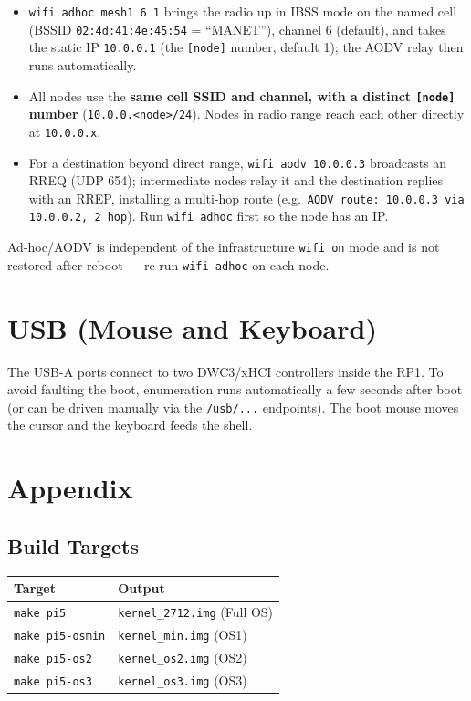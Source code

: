 \documentclass[a4paper,11pt]{article}
\newcommand{\cmd}[1]{\texttt{#1}}
\begin{document}
\begin{itemize}[noitemsep]
  \item \cmd{wifi adhoc mesh1 6 1} brings the radio up in IBSS mode on the named
        cell (BSSID \texttt{02:4d:41:4e:45:54} = ``MANET''), channel 6 (default),
        and takes the static IP \texttt{10.0.0.1} (the \texttt{[node]} number,
        default 1); the AODV relay then runs automatically.
  \item All nodes use the \textbf{same cell SSID and channel, with a distinct
        \texttt{[node]} number} (\texttt{10.0.0.<node>/24}). Nodes in radio range
        reach each other directly at \texttt{10.0.0.x}.
  \item For a destination beyond direct range, \cmd{wifi aodv 10.0.0.3}
        broadcasts an RREQ (UDP 654); intermediate nodes relay it and the
        destination replies with an RREP, installing a multi-hop route
        (e.g.\ \texttt{AODV route: 10.0.0.3 via 10.0.0.2, 2 hop}). Run
        \cmd{wifi adhoc} first so the node has an IP.
\end{itemize}
Ad-hoc/AODV is independent of the infrastructure \cmd{wifi on} mode and is not
restored after reboot --- re-run \cmd{wifi adhoc} on each node.

\section{USB (Mouse and Keyboard)}
\label{sec:usb}
The USB-A ports connect to two DWC3/xHCI controllers inside the RP1.
To avoid faulting the boot, enumeration runs automatically a few seconds
after boot (or can be driven manually via the \texttt{/usb/...} endpoints).
The boot mouse moves the cursor and the keyboard feeds the shell.

\section{Appendix}

\subsection{Build Targets}
\begin{longtable}{ll}
\hline
Target & Output \\
\hline
\cmd{make pi5} & \texttt{kernel\_2712.img} (Full OS) \\
\cmd{make pi5-osmin} & \texttt{kernel\_min.img} (OS1) \\
\cmd{make pi5-os2} & \texttt{kernel\_os2.img} (OS2) \\
\cmd{make pi5-os3} & \texttt{kernel\_os3.img} (OS3) \\
\hline
\end{longtable}
\end{document}

